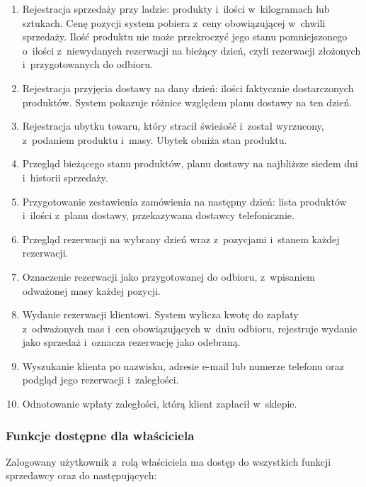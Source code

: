 \documentclass[12pt,a4paper,oneside]{article}
\newcounter{pu}
\begin{document}
\begin{enumerate}[resume*=wf]
	\item \label{wf:sprzedaz} Rejestracja sprzedaży przy ladzie: produkty i~ilości w~kilogramach lub sztukach. Cenę pozycji system pobiera z~ceny obowiązującej w~chwili sprzedaży. Ilość produktu nie może przekroczyć jego stanu pomniejszonego o~ilości z~niewydanych rezerwacji na bieżący dzień, czyli rezerwacji złożonych i~przygotowanych do odbioru.
	\item \label{wf:dostawa} Rejestracja przyjęcia dostawy na dany dzień: ilości faktycznie dostarczonych produktów. System pokazuje różnice względem planu dostawy na ten dzień.
	\item \label{wf:ubytek} Rejestracja ubytku towaru, który stracił świeżość i~został wyrzucony, z~podaniem produktu i~masy. Ubytek obniża stan produktu.
	\item \label{wf:stan} Przegląd bieżącego stanu produktów, planu dostawy na najbliższe siedem dni i~historii sprzedaży.
	\item \label{wf:zestawienie-zamowienia} Przygotowanie zestawienia zamówienia na następny dzień: lista produktów i~ilości z~planu dostawy, przekazywana dostawcy telefonicznie.
	\item \label{wf:lista-rezerwacji} Przegląd rezerwacji na wybrany dzień wraz z~pozycjami i~stanem każdej rezerwacji.
	\item \label{wf:przygotowanie} Oznaczenie rezerwacji jako przygotowanej do odbioru, z~wpisaniem odważonej masy każdej pozycji.
	\item \label{wf:wydanie} Wydanie rezerwacji klientowi. System wylicza kwotę do zapłaty z~odważonych mas i~cen obowiązujących w~dniu odbioru, rejestruje wydanie jako sprzedaż i~oznacza rezerwację jako odebraną.
	\item \label{wf:wyszukanie} Wyszukanie klienta po nazwisku, adresie e-mail lub numerze telefonu oraz podgląd jego rezerwacji i~zaległości.
	\item \label{wf:wplata} Odnotowanie wpłaty zaległości, którą klient zapłacił w~sklepie.
\end{enumerate}

\subsubsection{Funkcje dostępne dla właściciela}

Zalogowany użytkownik z~rolą właściciela ma dostęp do wszystkich funkcji sprzedawcy oraz do następujących:
\end{document}
